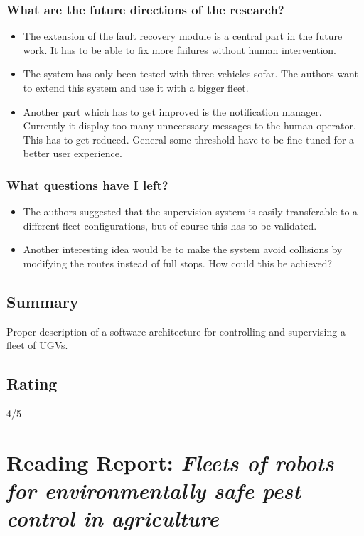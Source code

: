 \documentclass{article}
\begin{document}
\subsubsection*{What are the future directions of the research?}
\begin{itemize}
    \item The extension of the fault recovery module is a central part in the future work. It has to be able to fix more failures without human intervention. 
    \item The system has only been tested with three vehicles sofar. The authors want to extend this system and use it with a bigger fleet.
    \item Another part which has to get improved is the notification manager. Currently it display too many unnecessary messages to the human operator. This has to get reduced. General some threshold have to be fine tuned for a better user experience.
\end{itemize}
\subsubsection*{What questions have I left?}
\begin{itemize}
    \item The authors suggested that the supervision system is easily transferable to a different fleet configurations, but of course this has to be validated. 
    \item Another interesting idea would be to make the system avoid collisions by modifying the routes instead of full stops. How could this be achieved?
\end{itemize}

\subsection*{Summary}
Proper description of a software architecture for controlling and supervising a fleet of UGVs.
\subsection*{Rating}
4/5


\section{Reading Report: \emph{Fleets of robots for environmentally safe pest control in agriculture}}
\cite{deSantos2016}
\end{document}
